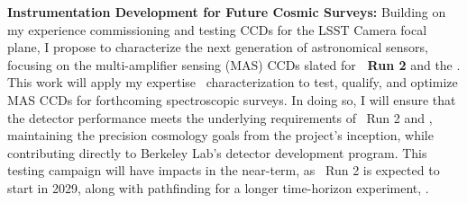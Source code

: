 
\textbf{Instrumentation Development for Future Cosmic Surveys:}
Building on my experience commissioning and testing CCDs for the LSST Camera focal plane, I propose to characterize the next generation of astronomical sensors, focusing on the multi-amplifier sensing (MAS) CCDs slated for \textbf{\DESI\ Run 2} and the \specsfive. This work will apply my expertise \LSSTCam\ characterization to test, qualify, and optimize MAS CCDs for forthcoming spectroscopic surveys. In doing so, I will ensure that the detector performance meets the underlying requirements of \DESI\ Run 2 and \specsfive, maintaining the precision cosmology goals from the project's inception, while contributing directly to Berkeley Lab's detector development program. This testing campaign will have impacts in the near-term, as \DESI\ Run 2 is expected to start in 2029, along with pathfinding for a longer time-horizon experiment, \specsfive.

